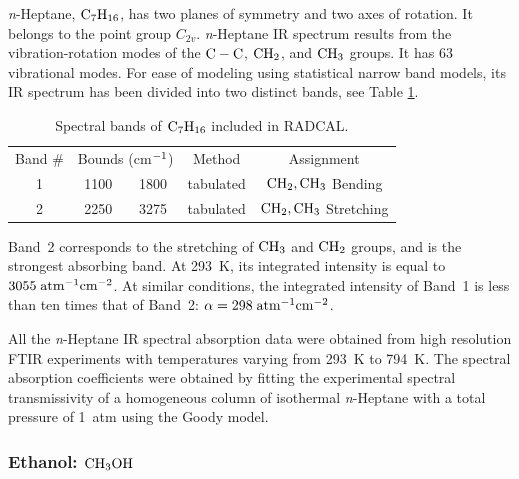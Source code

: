 \textit{n}-Heptane, $\rm C_7H_{16}$, has two planes of symmetry and two axes of rotation. It belongs to the point group $C_{2v}$. \textit{n}-Heptane IR spectrum results from the vibration-rotation modes of the $\rm C-C$, $\rm CH_2$, and $\rm CH_3$ groups. It has 63 vibrational modes. For ease of modeling using statistical narrow band models, its IR spectrum has been divided into two distinct bands, see Table \ref{Table::C7H16}.
\begin{table}[ht]
   \centering
   \caption{Spectral bands of $\rm C_7H_{16}$ included in RADCAL.}
   \vspace{0.1in}
   \label{Table::C7H16}
   \begin{tabular}{|c|c|c|c|c|}
    \hline
    Band \# & \multicolumn{2}{|l|}{Bounds (cm$\rm ^{-1}$) } & Method & Assignment \\
    \cline{1-5}
    1 & 1100  & 1800 & tabulated &  $\rm CH_2, CH_3$ Bending   \\
    2 & 2250  & 3275 & tabulated &  $\rm CH_2, CH_3$ Stretching \\
    \hline
   \end{tabular}
\end{table}
Band~2 corresponds to the stretching of $\rm CH_3$ and $\rm CH_2$ groups, and is the strongest absorbing band. At 293~K, its integrated intensity is equal to $3055\;\rm {atm^{-1}cm^{-2}}$. At similar conditions, the integrated intensity of Band~1 is less than ten times that of Band~2: $\alpha = 298\;\rm {atm^{-1}cm^{-2}}$.

All the \textit{n}-Heptane IR spectral absorption data were obtained from high resolution FTIR experiments with temperatures varying from 293~K to 794~K. The spectral absorption coefficients were obtained by fitting the experimental spectral transmissivity of a homogeneous column of isothermal \textit{n}-Heptane with a total pressure of 1~atm using the Goody model.

\subsubsection{Ethanol: $\rm CH_3OH$}

